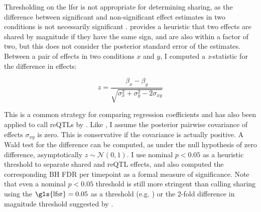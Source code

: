 Thresholding on the \gls{lfsr} is not appropriate for determining sharing, as the difference between significant and non-significant effect estimates in two conditions is not necessarily significant \autocite{schenker2001JudgingSignificanceDifferences,gelman2006DifferenceSignificantNot}.
\textcite{urbut2018FlexibleStatisticalMethods} provides a heuristic that two effects are shared by magnitude if they have the same sign, and are also within a factor of two,
but this does not consider the posterior standard error of the estimates.
Between a pair of effects in two conditions $x$ and $y$, I computed a \textit{z}-statistic for the difference in effects:

\begin{equation}
    z = \frac{\beta_x - \beta_y}{\sqrt{\sigma_x^2 + \sigma_y^2 - 2\sigma_{xy}}}
\end{equation}

This is a common strategy for comparing regression coefficients \autocite{clogg1995StatisticalMethodsComparing,schenker2001JudgingSignificanceDifferences} and has also been applied to call \glspl{reQTL} by \textcite{kim-hellmuth2017GeneticRegulatoryEffects}.
Like \textcite{kim-hellmuth2017GeneticRegulatoryEffects}, I assume the posterior pairwise covariance of effects $\sigma_{xy}$ is zero.
This is conservative if the covariance is actually positive.
A Wald test \pvalue{} for the difference can be computed, as under the null hypothesis of zero difference, asymptotically $z \sim \mathcal{N}(0, 1)$.
I use nominal $p < 0.05$ as a heuristic threshold to separate shared and \gls{reQTL} effects,
and also computed the corresponding \gls{BH} \gls{FDR} per timepoint as a formal measure of significance.
Note that even a nominal $p < 0.05$ threshold is still more stringent than calling sharing using the $\text{\gls{lfsr}} = 0.05$ as a threshold (e.g. \autocite{kim-hellmuth2020CellTypeSpecific,huang2020NeonatalGeneticsGene}) or the 2-fold difference in magnitude threshold suggested by \textcite{urbut2018FlexibleStatisticalMethods}.

